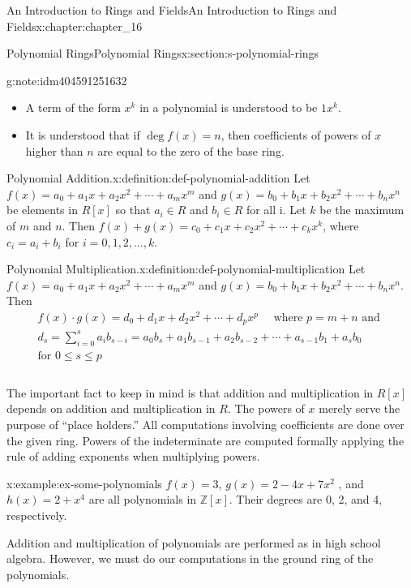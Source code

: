 \documentclass[twoside,10pt,]{book}
\numberwithin{equation}{section}
\begin{document}
\begin{chapterptx}{An Introduction to Rings and Fields}{}{An Introduction to Rings and Fields}{}{}{x:chapter:chapter_16}
\begin{sectionptx}{Polynomial Rings}{}{Polynomial Rings}{}{}{x:section:s-polynomial-rings}
\begin{note}{}{g:note:idm404591251632}
\begin{itemize}[label=\textbullet]
\item{}A term of the form \(x^k\) in a polynomial is understood to be \(1 x^k\).%
\item{}It is understood that if \(\deg f(x) = n\), then coefficients of powers of \(x\) higher than \(n\) are equal to the zero of the base ring.%
\end{itemize}
%
\end{note}
\begin{definition}{Polynomial Addition.}{x:definition:def-polynomial-addition}%
%
Let \(f(x) =a_0 + a_1 x+a_2 x^2+ \cdots +a_m x^m\) and \(g(x) =b_0 + b_1 x+b_2 x^2+ \cdots +b_n x^n\) be elements in \(R[x]\) so that \(a_i \in  R\) and \(b_i\in R\)  for all i. Let \(k\) be the maximum of \(m\) and \(n\).  Then  \(f(x) + g(x) =c_0 + c_1 x+c_2 x^2+ \cdots +c_k x^k\), where \(c_i=a_i+b_i\) for \(i = 0, 1, 2, \ldots , k\).%
\end{definition}
\begin{definition}{Polynomial Multiplication.}{x:definition:def-polynomial-multiplication}%
%
Let \(f(x) =a_0 + a_1 x+a_2 x^2+ \cdots +a_m x^m\) and \(g(x) =b_0 + b_1 x+b_2 x^2+ \cdots +b_n x^n\).  Then%
\begin{equation*}
\begin{array}{c}
f(x) \cdot  g(x) = d_0 + d_1 x+d_2 x^2+ \cdots +d_p x^p \quad \textrm{ where } p=m+n \textrm{ and }\\
d_s=\sum_{i=0}^s a_i b_{s-i} =a_0 b_s+a_1 b_{s-1}+a_2 b_{s-2}+\cdots +a_{s-1} b_1+a_s b_0\\
\textrm{for } 0\leq s\leq p\\
\\
\end{array}
\end{equation*}
%
\end{definition}
The important fact to keep in mind is that addition and multiplication in \(R[x]\) depends on addition and multiplication in \(R\). The powers of \(x\) merely serve the purpose of ``place holders.'' All computations involving coefficients are done over the given ring.  Powers of the indeterminate are computed formally applying the rule of adding exponents when multiplying powers.%
\begin{example}{}{x:example:ex-some-polynomials}%
\(f(x) = 3\), \(g(x) = 2 - 4x +7x^2\) , and \(h(x) = 2 + x^4\) are all polynomials in \(\mathbb{Z}[x]\). Their degrees are 0, 2, and 4, respectively.%
\end{example}
Addition and multiplication of polynomials are performed as in high school algebra. However, we must do our computations in the ground ring of the polynomials.%

\end{sectionptx}
\end{chapterptx}
\end{document}
